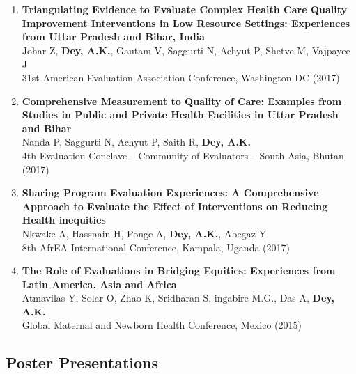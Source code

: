 \documentclass[13pt,letterpaper]{article}
\begin{document}
\begin{enumerate}
\item \textbf{Triangulating Evidence to Evaluate Complex Health Care Quality Improvement Interventions in Low Resource Settings: Experiences from Uttar Pradesh and Bihar, India}\\
Johar Z, \textbf{Dey, A.K.}, Gautam V, Saggurti N, Achyut P, Shetve M, Vajpayee J\\
31st American Evaluation Association Conference, Washington DC (2017)  

\item \textbf{Comprehensive Measurement to Quality of Care: Examples from Studies in Public and Private Health Facilities in Uttar Pradesh and Bihar}\\
Nanda P, Saggurti N, Achyut P, Saith R, \textbf{Dey, A.K.}\\
4th Evaluation Conclave – Community of Evaluators – South Asia, Bhutan (2017) 

\item \textbf{Sharing Program Evaluation Experiences: A Comprehensive Approach to Evaluate the Effect of Interventions on Reducing Health inequities}\\
Nkwake A, Hassnain H, Ponge A, \textbf{Dey, A.K.}, Abegaz Y\\
8th AfrEA International Conference, Kampala, Uganda (2017) 

\item \textbf{The Role of Evaluations in Bridging Equities: Experiences from Latin America, Asia and Africa}\\
Atmavilas Y, Solar O, Zhao K, Sridharan S, ingabire M.G., Das A, \textbf{Dey, A.K.}\\
Global Maternal and Newborn Health Conference, Mexico (2015)   
\end{enumerate}
\subsection*{Poster Presentations}
\label{sec:orga11521e}
\end{document}
